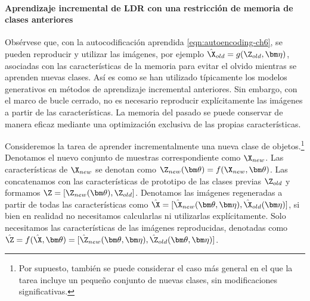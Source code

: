 \documentclass[../../book-main_es.tex]{subfiles}
\begin{document}
\paragraph{Aprendizaje incremental de LDR con una restricción de memoria de clases anteriores}
Obsérvese que, con la autocodificación aprendida
\eqref{eqn:autoencoding-ch6}, se pueden reproducir y utilizar las imágenes, por ejemplo
$\hat\X_{old} = g(\Z_{old}, \bm \eta)$, asociadas con las características de la memoria
para evitar el olvido mientras se aprenden nuevas clases. Así es
como se han utilizado típicamente los modelos generativos en métodos de aprendizaje incremental
anteriores. Sin embargo, con el marco de bucle cerrado, no es necesario
reproducir explícitamente las imágenes a partir de las características. La memoria del pasado se puede
conservar de manera eficaz mediante una optimización exclusiva de las
propias características.

Consideremos la tarea de aprender incrementalmente una nueva clase de
objetos.\footnote{Por supuesto, también se puede considerar el caso más general
    en el que la tarea incluye un pequeño conjunto de nuevas clases, sin
modificaciones significativas.} Denotamos el nuevo conjunto de muestras correspondiente como
$\X_{new}$. Las características de $\X_{new}$ se denotan como $\Z_{new}(\bm
\theta) = f(\X_{new}, \bm \theta)$. Las concatenamos con
las características de prototipo de las clases previas $\Z_{old}$ y formamos $\Z =
[\Z_{new}(\bm \theta), \Z_{old}]$. Denotamos las imágenes regeneradas a partir de
todas las características como $\hat{\X} = [{\hat{\X}_{new}(\bm \theta,\bm \eta)},
{\hat{\X}_{old}(\bm \eta)}]$, si bien en realidad no necesitamos
calcularlas ni utilizarlas explícitamente. Solo necesitamos las características de las imágenes reproducidas,
denotadas como $\hat{\Z} = f(\hat{\X}, \bm \theta) =
[{\hat{\Z}_{new}(\bm \theta,\bm \eta)}, {\hat{\Z}_{old}(\bm \theta,\bm \eta)}]$.
\end{document}

